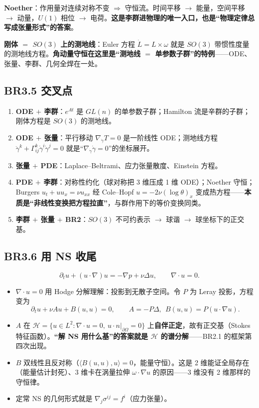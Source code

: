 \textbf{Noether}：作用量对连续对称不变 $\Rightarrow$ 守恒流。时间平移 $\to$ 能量，空间平移 $\to$ 动量，$U(1)$ 相位 $\to$ 电荷。\textbf{这是李群进物理的唯一入口，也是“物理定律总写成张量形式”的答案}。

\textbf{刚体 $=$ $SO(3)$ 上的测地线}：Euler 方程 $\dot L=L\times\omega$ 就是 $SO(3)$ 带惯性度量的测地线方程。\textbf{角动量守恒在这里是“测地线 $=$ 单参数子群”的特例}——ODE、张量、李群、几何全焊在一处。

\subsection{BR3.5 交叉点}

\begin{enumerate}
  \item \textbf{ODE $+$ 李群}：$e^{At}$ 是 $GL(n)$ 的单参数子群；Hamilton 流是辛群的子群；刚体方程是 $SO(3)$ 的测地线。
  \item \textbf{ODE $+$ 张量}：平行移动 $\nabla_{\dot\gamma}T=0$ 是一阶线性 ODE；测地线方程 $\ddot\gamma^k+\Gamma^k_{ij}\dot\gamma^i\dot\gamma^j=0$ 就是“$\nabla_{\dot\gamma}\dot\gamma=0$”的坐标展开。
  \item \textbf{张量 $+$ PDE}：Laplace--Beltrami、应力张量散度、Einstein 方程。
  \item \textbf{PDE $+$ 李群}：对称性约化（球对称把 3 维压成 1 维 ODE）；Noether 守恒；Burgers $u_t+uu_x=\nu u_{xx}$ 经 Cole--Hopf $u=-2\nu(\log\theta)_x$ 变成热方程——\textbf{本质是“非线性变换把方程拉直”}，与群作用下的等价变换同类。
  \item \textbf{李群 $+$ 张量 $+$ BR2}：$SO(3)$ 不可约表示 $\to$ 球谐 $\to$ 球坐标下的正交基。
\end{enumerate}

\subsection{BR3.6 用 NS 收尾}

\[
\partial_tu+(u\cdot\nabla)u=-\nabla p+\nu\Delta u,\qquad \nabla\cdot u=0 .
\]
\begin{itemize}
  \item $\nabla\cdot u=0$ 用 Hodge 分解理解：投影到无散子空间。令 $P$ 为 Leray 投影，方程变为
  \[
  \partial_tu+\nu Au+B(u,u)=0,\qquad A=-P\Delta,\ \ B(u,u)=P(u\cdot\nabla u).
  \]
  \item $A$ 在 $\mathcal{H}=\{u\in L^2:\nabla\cdot u=0,\ u\cdot n|_{\partial\Omega}=0\}$ 上\textbf{自伴正定}，故有正交基（Stokes 特征函数）。\textbf{“解 NS 用什么基”的答案就是 $\mathcal{H}$ 的谱分解}——BR2.1 的框架第四次出现。
  \item $B$ 双线性且反对称（$\langle B(u,u),u\rangle=0$，能量守恒）。这是 2 维能证全局存在（能量估计封死）、3 维卡在涡量拉伸 $\omega\cdot\nabla u$ 的原因——3 维没有 2 维那样的守恒律。
  \item 定常 NS 的几何形式就是 $\nabla_j\sigma^{ij}=f^i$（应力张量）。
\end{itemize}


